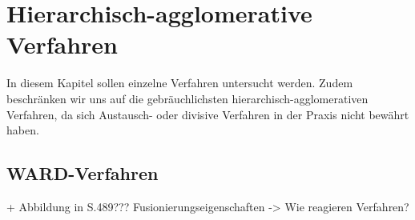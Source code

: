 \chapter{Hierarchisch-agglomerative Verfahren}

In diesem Kapitel sollen einzelne Verfahren untersucht werden. Zudem beschränken wir uns auf die gebräuchlichsten hierarchisch-agglomerativen Verfahren, da sich Austausch- oder divisive Verfahren in der Praxis nicht bewährt haben.


\section{WARD-Verfahren}

+ Abbildung in \cite{Backhaus.2016} S.489??? Fusionierungseigenschaften -> Wie reagieren Verfahren?